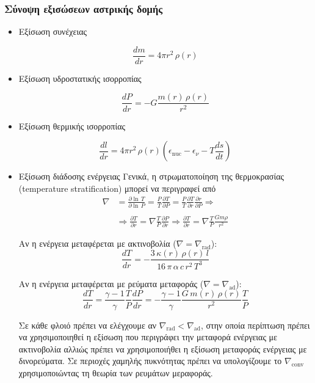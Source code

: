 \subsubsection{Σύνοψη εξισώσεων αστρικής δομής}
\begin{itemize}
    \item Εξίσωση συνέχειας
    
    \begin{equation*}
        \frac{dm}{dr} = 4\pi r^2 \, \rho(r)
    \end{equation*}
    
    \item Εξίσωση υδροστατικής ισορροπίας
    
    \begin{equation*}
        \frac{dP}{dr} = - G \frac{m(r) \,\rho(r)}{r^2}
    \end{equation*}
    
    \item Εξίσωση θερμικής ισορροπίας
    
    \begin{equation*}
        \frac{dl}{dr} = 4\pi r^2 \,\rho(r) \left(\epsilon_{\text{nuc}} - \epsilon_\nu - T \frac{ds}{dt} \right)
    \end{equation*}
    
    \item Εξίσωση διάδοσης ενέργειας
    Γενικά, η στρωματοποίηση της θερμοκρασίας (temperature stratification) μπορεί να περιγραφεί από 
    \begin{align*}
        \nabla &= \frac{\partial \ln \,T}{\partial \ln \,P} = \frac{P}{T} \frac{\partial T}{\partial P} = \frac{P}{T} \frac{\partial T}{\partial r} \frac{\partial r}{\partial P}  \Rightarrow \\\\
        & \Rightarrow \frac{\partial T}{\partial r} = \nabla \frac{T}{P} \frac{\partial P}{\partial r} \Rightarrow \boxed{\frac{\partial T}{\partial r} = \nabla \frac{T}{P} \frac{Gm \rho}{r^2}}
    \end{align*}
    
    Αν η ενέργεια μεταφέρεται με ακτινοβολία ($\nabla = \nabla_{\text{rad}}$):
    \begin{equation*}
        \frac{dT}{dr} = - \frac{3 \,\kappa(r) \,\rho(r) \,l}{16 \,\pi \,\alpha \,c \,r^2 \,T^3}
    \end{equation*}
    
    Αν η ενέργεια μεταφέρεται με ρεύματα μεταφοράς ($\nabla = \nabla_{\text{ad}}$):
    \begin{equation*}
        \frac{dT}{dr} = \frac{\gamma - 1}{\gamma} \frac{T}{P} \frac{dP}{dr} = - \frac{\gamma - 1}{\gamma} \frac{G \,m(r) \,\rho(r)}{r^2} \frac{T}{P}
    \end{equation*}
    
    Σε κάθε φλοιό πρέπει να ελέγχουμε αν $\nabla_{\text{rad}} < \nabla_{\text{ad}}$, στην οποία περίπτωση πρέπει να χρησιμοποιηθεί η εξίσωση που περιγράφει την μεταφορά ενέργειας με ακτινοβολία αλλιώς πρέπει να χρησιμοποιήθει η εξίσωση μεταφοράς ενέργειας με δινορεύματα. Σε περιοχές χαμηλής πυκνότητας πρέπει να υπολογίζουμε το $\nabla_{\text{conv}}$ χρησιμοποιώντας τη θεωρία των ρευμάτων μεραφοράς.
\end{itemize}

